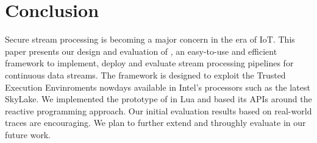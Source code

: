 \section{Conclusion}
\label{sec:conclusion}
Secure stream processing is becoming a major concern in the era of IoT. 
This paper presents our design and evaluation of \SYS, an easy-to-use and efficient framework to implement, deploy and evaluate stream processing pipelines for continuous data streams.
The framework is designed to exploit the Trusted Execution Envinroments nowdays available in Intel's processors such as the latest SkyLake. 
We implemented the prototype of \SYS in Lua and based its APIs around the reactive programming approach.
Our initial evaluation results based on real-world traces are encouraging. 
We plan to further extend and throughly evaluate \SYS in our future work.
